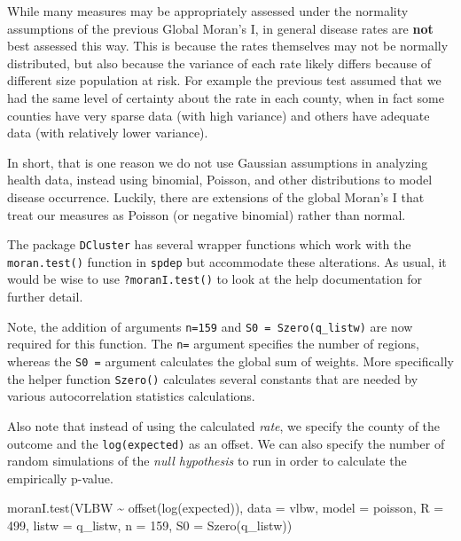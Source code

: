 \documentclass[
]{book}
\newenvironment{Shaded}{\begin{snugshade}}{\end{snugshade}}
\newcommand{\AttributeTok}[1]{\textcolor[rgb]{0.77,0.63,0.00}{#1}}
\newcommand{\DecValTok}[1]{\textcolor[rgb]{0.00,0.00,0.81}{#1}}
\newcommand{\FunctionTok}[1]{\textcolor[rgb]{0.00,0.00,0.00}{#1}}
\newcommand{\NormalTok}[1]{#1}
\newcommand{\SpecialCharTok}[1]{\textcolor[rgb]{0.00,0.00,0.00}{#1}}
\newcommand{\StringTok}[1]{\textcolor[rgb]{0.31,0.60,0.02}{#1}}
\begin{document}
While many measures may be appropriately assessed under the normality assumptions of the previous Global Moran's I, in general disease rates are \textbf{not} best assessed this way. This is because the rates themselves may not be normally distributed, but also because the variance of each rate likely differs because of different size population at risk. For example the previous test assumed that we had the same level of certainty about the rate in each county, when in fact some counties have very sparse data (with high variance) and others have adequate data (with relatively lower variance).

In short, that is one reason we do not use Gaussian assumptions in analyzing health data, instead using binomial, Poisson, and other distributions to model disease occurrence. Luckily, there are extensions of the global Moran's I that treat our measures as Poisson (or negative binomial) rather than normal.

The package \texttt{DCluster} has several wrapper functions which work with the \texttt{moran.test()} function in \texttt{spdep} but accommodate these alterations. As usual, it would be wise to use \texttt{?moranI.test()} to look at the help documentation for further detail.

Note, the addition of arguments \texttt{n=159} and \texttt{S0\ =\ Szero(q\_listw)} are now required for this function. The \texttt{n=} argument specifies the number of regions, whereas the \texttt{S0\ =} argument calculates the global sum of weights. More specifically the helper function \texttt{Szero()} calculates several constants that are needed by various autocorrelation statistics calculations.

Also note that instead of using the calculated \emph{rate}, we specify the county of the outcome and the \texttt{log(expected)} as an offset. We can also specify the number of random simulations of the \emph{null hypothesis} to run in order to calculate the empirically p-value.

\begin{Shaded}
\begin{Highlighting}[]
\FunctionTok{moranI.test}\NormalTok{(VLBW }\SpecialCharTok{\textasciitilde{}} \FunctionTok{offset}\NormalTok{(}\FunctionTok{log}\NormalTok{(expected)), }
                  \AttributeTok{data =}\NormalTok{ vlbw,}
                  \AttributeTok{model =} \StringTok{\textquotesingle{}poisson\textquotesingle{}}\NormalTok{,}
                  \AttributeTok{R =} \DecValTok{499}\NormalTok{,}
                  \AttributeTok{listw =}\NormalTok{ q\_listw,}
                  \AttributeTok{n =} \DecValTok{159}\NormalTok{,}
                  \AttributeTok{S0 =} \FunctionTok{Szero}\NormalTok{(q\_listw))}
\end{Highlighting}
\end{Shaded}
\end{document}
